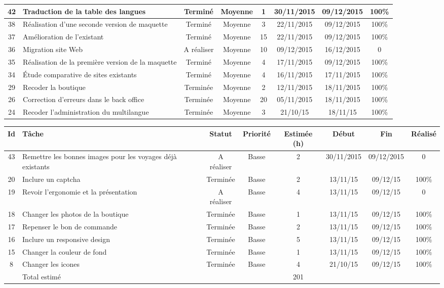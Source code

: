 \begin{tabular}{ | c | p{4cm} | c | c | c | c | c | c |  }
42 & Traduction de la table des langues & Terminé & Moyenne &  1 & 30/11/2015 &
09/12/2015 & 100\% \\ \hline
 38 & Réalisation d'une seconde version de maquette  & Terminé & Moyenne &  3 &
 22/11/2015 & 09/12/2015 & 100\% \\ \hline 
 37 & Amélioration de l'existant & Terminé & Moyenne &  15 & 22/11/2015 &
 09/12/2015 & 100\% \\ \hline 
 36 & Migration site Web & A réaliser & Moyenne &  10 & 09/12/2015 & 16/12/2015
 & 0 \\ \hline
  35 & Réalisation de la première version de la maquette & Terminé & Moyenne & 
  4 & 17/11/2015 & 09/12/2015 & 100\% \\ \hline 
  34 & Étude comparative de sites existants & Terminé & Moyenne &  4 &
  16/11/2015 & 17/11/2015 & 100\% \\ 
  \hline 29 & Recoder la boutique & Terminée & Moyenne & 2
	& 12/11/2015 & 18/11/2015 & 100\%  \\ \hline
26 & Correction d'erreurs dans le back office & Terminée &
Moyenne & 20 & 05/11/2015 & 18/11/2015 & 100\%  \\ \hline
24 & Recoder l'administration du
	multilangue & Terminée & Moyenne & 3 & 21/10/15 & 18/11/15 & 100\%  \\ \hline
	
	 \end{tabular}
	 \newpage
	\begin{tabular}{ | c | p{4cm} | c | c | c | c | c | c |  }
\hline 
Id & Tâche & Statut & Priorité & Estimée (h) & Début & Fin & Réalisé \\ \hline
43 &  Remettre les bonnes images pour les voyages déjà
existants & A réaliser & Basse & 2 & 30/11/2015 & 09/12/2015 & 0 \\ \hline
 20 & Inclure un captcha & Terminée & Basse & 2 & 13/11/15 &
	09/12/15 & 100\%  \\ \hline
19 & Revoir l'ergonomie et la présentation & A réaliser & Basse & 4 & 13/11/15
	& 09/12/15 & 0 \\ \hline
18 & Changer les photos de la boutique & Terminée & Basse & 1 & 13/11/15 &
	09/12/15 & 100\%  \\ \hline
17 & Repenser le bon de commande & Terminée & Basse & 2 & 13/11/15 & 09/12/15
	&  100\% \\ \hline
16 & Inclure un responsive design & Terminée & Basse & 5 &
	13/11/15 & 09/12/15 & 100\% \\ \hline
15 & Changer la couleur de fond & Terminée & Basse & 1 & 13/11/15 & 09/12/15
	& 100\%  \\ \hline
8 & Changer les icones & Terminée & Basse & 4 & 21/10/15 & 09/12/15 & 100\% \\
\hline

 & Total estimé &  &  & 201 &  &  & \\ \hline
 \end{tabular}